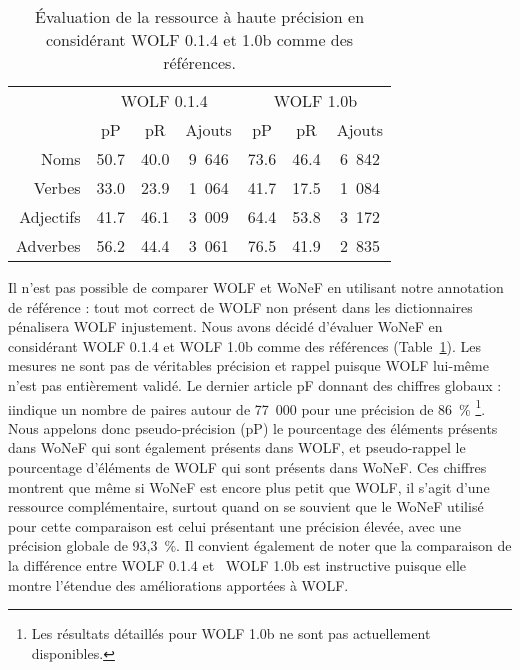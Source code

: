 \begin{table}[ht]
\centering
\begin{tabular}{rccc|ccc}
  \toprule
             & \multicolumn{3}{c}{WOLF 0.1.4}    & \multicolumn{3}{c}{WOLF 1.0b} \\
             &   pP      &    pR     & Ajouts    &     pP    &    pR    & Ajouts \\
  Noms       & 50.7     & 40.0     & 9~646     & 73.6     & 46.4    & 6~842  \\
  Verbes     & 33.0     & 23.9     & 1~064     & 41.7     & 17.5    & 1~084  \\
  Adjectifs  & 41.7     & 46.1     & 3~009     & 64.4     & 53.8    & 3~172  \\
  Adverbes   & 56.2     & 44.4     & 3~061     & 76.5     & 41.9    & 2~835  \\ 
  \bottomrule
\end{tabular}
\caption{\protect\centering\label{table:wolfcomparison}Évaluation de la ressource à haute précision en considérant WOLF 0.1.4 et 1.0b comme des références.}
\end{table}


Il n'est pas possible de comparer WOLF et WoNeF en utilisant notre annotation
de référence : tout mot correct de WOLF non présent dans les dictionnaires
pénalisera WOLF injustement. Nous avons décidé d'évaluer WoNeF en considérant
WOLF 0.1.4 et WOLF 1.0b comme des références
(Table~\ref{table:wolfcomparison}). Les mesures ne sont pas de véritables
précision et rappel puisque WOLF lui-même n'est pas entièrement validé. Le
dernier article pF donnant des chiffres globaux \citep{sagot2012automatic} :
iindique un nombre de paires autour de 77~000 pour une précision de 86~\%
\footnote{Les résultats détaillés pour WOLF 1.0b ne sont pas actuellement
disponibles.}. Nous appelons donc pseudo-précision (pP) le pourcentage des
éléments présents dans WoNeF qui sont également présents dans WOLF, et
pseudo-rappel le pourcentage d'éléments de WOLF qui sont présents dans WoNeF.
Ces chiffres montrent que même si WoNeF est encore plus petit que WOLF, il
s'agit d'une ressource complémentaire, surtout quand on se souvient que le
WoNeF utilisé pour cette comparaison est celui présentant une précision élevée,
avec une précision globale de 93,3~\%. Il convient également de noter que la
comparaison de la différence entre WOLF 0.1.4 et \ WOLF 1.0b est instructive
puisque elle montre l'étendue des améliorations apportées à WOLF.

